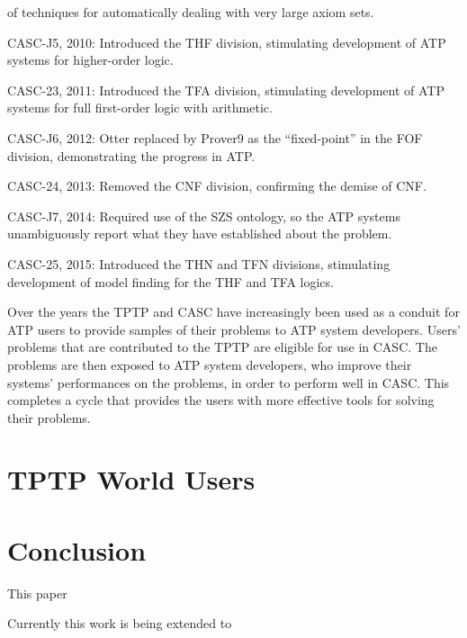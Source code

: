 \documentclass{easychair}
\newenvironment{packed_itemize}{
\vspace*{-0.2em}
\begin{itemize}
\setlength{\partopsep}{0pt}
\setlength{\itemsep}{1pt}
\setlength{\parskip}{0pt}
\setlength{\parsep}{0pt}
}{\end{itemize}}
\begin{document}
\begin{packed_itemize}
    of techniques for automatically dealing with very large axiom sets.
\item CASC-J5, 2010: Introduced the THF division, stimulating development
    of ATP systems for higher-order logic.
\item CASC-23, 2011: Introduced the TFA division, stimulating development
    of ATP systems for full first-order logic with arithmetic.
\item CASC-J6, 2012: Otter replaced by Prover9 as the ``fixed-point'' in the
    FOF division, demonstrating the progress in ATP.
\item CASC-24, 2013: Removed the CNF division, confirming the demise of CNF.
\item CASC-J7, 2014: Required use of the SZS ontology, so the ATP systems 
    unambiguously report what they have established about the problem.
\item CASC-25, 2015: Introduced the THN and TFN divisions, stimulating
    development of model finding for the THF and TFA logics.
\end{packed_itemize}

Over the years the TPTP and CASC have increasingly been used as a conduit 
for ATP users to provide samples of their problems to ATP system developers.
Users' problems that are contributed to the TPTP are eligible for use
in CASC.
The problems are then exposed to ATP system developers, who improve their 
systems' performances on the problems, in order to perform well in CASC.
This completes a cycle that provides the users with more effective tools
for solving their problems.
\section{TPTP World Users}
\label{Users}

\section{Conclusion}
\label{Conclusion}

This paper 

Currently this work is being extended to 



\end{document}
